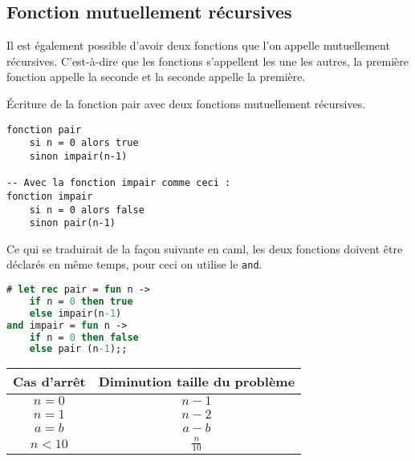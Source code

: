 	\subsection{Fonction mutuellement récursives}
	Il est également possible d'avoir deux fonctions que l'on appelle mutuellement récursives. C'est-à-dire que les fonctions s'appellent les une les
	autres, la première fonction appelle la seconde et la seconde appelle la première.

	\begin{exemple}
		Écriture de la fonction pair avec deux fonctions mutuellement récursives.	
\begin{lstlisting}[language=algo, numbers=none, framerule=0pt, caption=Algorithme de la récursivité mutuelle pour pair]
fonction pair	
	si n = 0 alors true
	sinon impair(n-1)

-- Avec la fonction impair comme ceci : 
fonction impair
	si n = 0 alors false 
	sinon pair(n-1)
\end{lstlisting}
Ce qui se traduirait de la façon suivante en caml, les deux fonctions doivent être déclarés en même temps, pour ceci on utilise le \texttt{and}.
\begin{lstlisting}[language=Caml, caption=Récursivité mutuelle pour pair, numbers=none, framerule=0pt]
# let rec pair = fun n ->
	if n = 0 then true
	else impair(n-1)
and impair = fun n -> 
	if n = 0 then false
	else pair (n-1);;
\end{lstlisting}

	\end{exemple}

	\begin{tabular}{c|c}
		Cas d'arrêt & Diminution taille du problème\\
		\hline
		$n=0$ & $n - 1$\\
		$n=1$ & $n - 2$\\
		$a=b$ & $a-b$\\
		$n<10$ & $\frac{n}{10}$
	\end{tabular}

